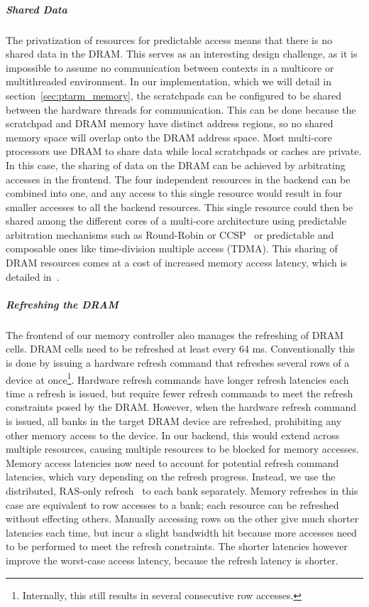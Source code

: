 \subparagraph{Shared Data}
The privatization of resources for predictable access means that there is no shared data in the DRAM.
This serves as an interesting design challenge, as it is impossible to assume no communication between contexts in a multicore or multithreaded environment.
In our implementation, which we will detail in section~\ref{sec:ptarm_memory}, the scratchpads can be configured to be shared between the hardware threads for communication.  
This can be done because the scratchpad and DRAM memory have distinct address regions, so no shared memory space will overlap onto the DRAM address space. 
Most multi-core processors use DRAM to share data while local scratchpads or caches are private.
In this case, the sharing of data on the DRAM can be achieved by arbitrating accesses in the frontend.
The four independent resources in the backend can be combined into one, and any access to this single resource would result in four smaller accesses to all the backend resources. 
This single resource could then be shared among the different cores of a multi-core architecture using predictable arbitration mechanisms such as Round-Robin or CCSP~\cite{Akesson08} or predictable and composable ones like time-division multiple access (TDMA). 
This sharing of DRAM resources comes at a cost of increased memory access latency, which is detailed in~\cite{ReinekeLiuPatelKimLee11_PRETDRAMControllerBankPrivatizationForPredictability}. 

\subparagraph{Refreshing the DRAM}
The frontend of our memory controller also manages the refreshing of DRAM cells. 
DRAM cells need to be refreshed at least every 64 ms.
Conventionally this is done by issuing a hardware refresh command that refreshes several rows of a device at once\footnote{Internally, this still results in several consecutive row accesses.}.
Hardware refresh commands have longer refresh latencies each time a refresh is issued, but require fewer refresh commands to meet the refresh constraints posed by the DRAM.
However, when the hardware refresh command is issued, all banks in the target DRAM device are refreshed, prohibiting any other memory access to the device.
In our backend, this would extend across multiple resources, causing multiple resources to be blocked for memory accesses. 
Memory access latencies now need to account for potential refresh command latencies, which vary depending on the refresh progress.  
Instead, we use the distributed, RAS-only refresh~\cite{spec:micronddr2} to each bank separately.
Memory refreshes in this case are equivalent to row accesses to a bank; each resource can be refreshed without effecting others.
Manually accessing rows on the other give much shorter latencies each time, but incur a slight bandwidth hit because more accesses need to be performed to meet the refresh constraints.
The shorter latencies however improve the worst-case access latency, because the refresh latency is shorter.

